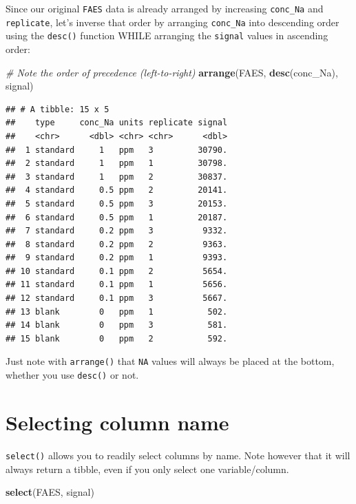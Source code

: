 \documentclass[
]{book}
\newenvironment{Shaded}{\begin{snugshade}}{\end{snugshade}}
\newcommand{\CommentTok}[1]{\textcolor[rgb]{0.56,0.35,0.01}{\textit{#1}}}
\newcommand{\FunctionTok}[1]{\textcolor[rgb]{0.13,0.29,0.53}{\textbf{#1}}}
\newcommand{\NormalTok}[1]{#1}
\begin{document}
Since our original \texttt{FAES} data is already arranged by increasing \texttt{conc\_Na} and \texttt{replicate}, let's inverse that order by arranging \texttt{conc\_Na} into descending order using the \texttt{desc()} function WHILE arranging the \texttt{signal} values in ascending order:

\begin{Shaded}
\begin{Highlighting}[]
\CommentTok{\# Note the order of precedence (left{-}to{-}right)}
\FunctionTok{arrange}\NormalTok{(FAES, }\FunctionTok{desc}\NormalTok{(conc\_Na), signal)}
\end{Highlighting}
\end{Shaded}

\begin{verbatim}
## # A tibble: 15 x 5
##    type     conc_Na units replicate signal
##    <chr>      <dbl> <chr> <chr>      <dbl>
##  1 standard     1   ppm   3         30790.
##  2 standard     1   ppm   1         30798.
##  3 standard     1   ppm   2         30837.
##  4 standard     0.5 ppm   2         20141.
##  5 standard     0.5 ppm   3         20153.
##  6 standard     0.5 ppm   1         20187.
##  7 standard     0.2 ppm   3          9332.
##  8 standard     0.2 ppm   2          9363.
##  9 standard     0.2 ppm   1          9393.
## 10 standard     0.1 ppm   2          5654.
## 11 standard     0.1 ppm   1          5656.
## 12 standard     0.1 ppm   3          5667.
## 13 blank        0   ppm   1           502.
## 14 blank        0   ppm   3           581.
## 15 blank        0   ppm   2           592.
\end{verbatim}

Just note with \texttt{arrange()} that \texttt{NA} values will always be placed at the bottom, whether you use \texttt{desc()} or not.

\hypertarget{selecting-column-name}{%
\section{Selecting column name}\label{selecting-column-name}}

\texttt{select()} allows you to readily select columns by name. Note however that it will always return a tibble, even if you only select one variable/column.

\begin{Shaded}
\begin{Highlighting}[]
\FunctionTok{select}\NormalTok{(FAES, signal)}
\end{Highlighting}
\end{Shaded}
\end{document}
